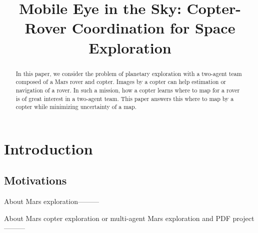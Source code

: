 \documentclass[conference]{IEEEtran}
\begin{document}
\title{\huge Mobile Eye in the Sky: Copter-Rover Coordination for Space Exploration}


\maketitle

\begin{abstract}
In this paper, we consider the problem of planetary exploration with a two-agent team composed of a Mars rover and copter. Images by a copter can help estimation or navigation of a rover. In such a mission, how a copter learns where to map for a rover is of great interest in a two-agent team. 
This paper answers this where to map by a copter while minimizing uncertainty of a map.
\end{abstract}

\IEEEpeerreviewmaketitle

\section{Introduction}
\subsection*{Motivations}
About Mars exploration---------

About Mars copter exploration or multi-agent Mars exploration and PDF project---------
\end{document}
